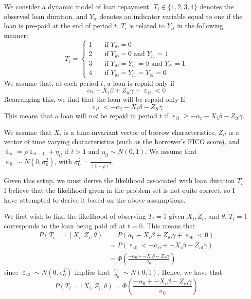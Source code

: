 \documentclass[12pt]{article}
\DeclareMathOperator{\eps}{\varepsilon}
\begin{document}
We consider a dynamic model of loan repayment. $T_i \in \{1,2,3,4\}$ denotes the observed loan duration, and $Y_{it}$ denotes an indicator variable equal to one if the loan is pre-paid at the end of period $t$. $T_i$ is related to $Y_{it}$ in the following manner:
\[T_i = \begin{cases} 1 \quad&\text{if } Y_{i0} = 0\\
    2 \quad&\text{if } Y_{i0} = 0 \text{ and } Y_{i1} = 1\\
    3 \quad&\text{if } Y_{i0} = Y_{i1}= 0 \text{ and } Y_{i2} = 1\\
    4 \quad&\text{if } Y_{i0} = Y_{i1} = Y_{i2} = 0
\end{cases}\]
We assume that, at each period $t$, a loan is repaid only if
\[\alpha_t + X_i \beta + Z_{it} \gamma + \eps_{it} < 0\]
Rearranging this, we find that the loan will be repaid only If
\[\eps_{it} < -\alpha_t - X_{i}\beta - Z_{it}\gamma\]
This means that a loan will \textit{not} be repaid in period $t$ if $\eps_{it} \geq -\alpha_t - X_{i}\beta - Z_{it}\gamma$.

We assume that $X_{i}$ is a time-invariant vector of borrow characteristics, $Z_{it}$ is a vector of time varying characteristics (such as the borrower's FICO score), and $\eps_{it} = \rho \eps_{i t-1} + \eta_{it}$ if $t > 1$ and $\eta_{it} \sim N(0,1)$. We assume that $\eps_{it} \sim N(0, \sigma^2_0)$, with $\sigma^2_0 = \frac{1}{(1-\rho)^2}$. 

Given this setup, we must derive the likelihood associated with loan duration $T_i$. I believe that the likelihood given in the problem set is not quite correct, so I have attempted to derive it based on the above assumptions.

We first wish to find the likelihood of observing $T_i = 1$ given $X_i, Z_i$, and $\theta$. $T_i = 1$ corresponds to the loan being paid off at $t = 0$. This means that 
\begin{align*} 
    P(T_i = 1 \mid X_i, Z_i, \theta) &= P(\alpha_0 + X_i \beta + Z_{i0} \gamma + \eps_{i0} < 0)\\
    &= P(\eps_{i0} < -\alpha_0 + -X_i \beta - Z_{i0} \gamma)\\
    &= \Phi\left(\frac{-\alpha_0 + -X_i \beta - Z_{i0} \gamma}{\sigma_0}\right)
\end{align*}
since $\eps_{i0} \sim N(0, \sigma^2_0)$ implies that $\frac{\eps_{i0}}{\sigma_0} \sim N(0,1)$. Hence, we have that
\[P(T_i = 1 X_i, Z_i, \theta) = \Phi\left(\frac{-\alpha_0 + -X_i \beta - Z_{i0} \gamma}{\sigma_0}\right)\]
\end{document}
